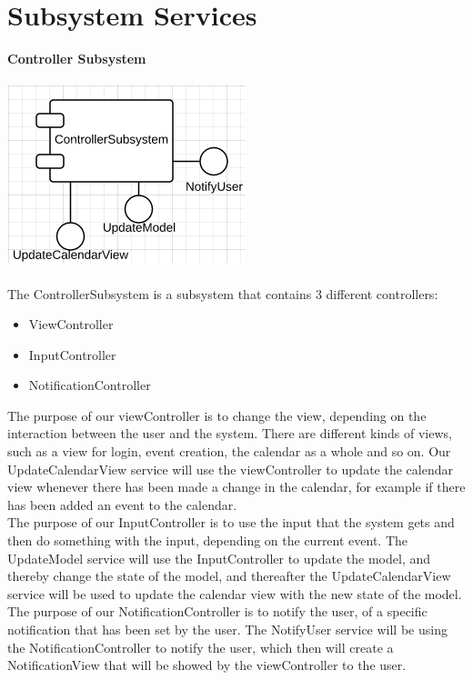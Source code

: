 \chapter{Subsystem Services}


\textbf{Controller Subsystem}\\\\
\includegraphics[scale=0.8]{ControllerServices}\\\\

The ControllerSubsystem is a subsystem that contains 3 different controllers:

\begin{itemize}
  \item ViewController
  \item InputController
  \item NotificationController
\end{itemize}

The purpose of our viewController is to change the view, depending on the interaction between the user and the system. There are different kinds of views, such as a view for login, event creation, the calendar as a whole and so on. Our UpdateCalendarView service will use the viewController to update the calendar view whenever there has been made a change in the calendar, for example if there has been added an event to the calendar.\\

The purpose of our InputController is to use the input that the system gets and then do something with the input, depending on the current event. The UpdateModel service will use the InputController to update the model, and thereby change the state of the model, and thereafter the UpdateCalendarView service will be used to update the calendar view with the new state of the model.\\

The purpose of our NotificationController is to notify the user, of a specific notification that has been set by the user. The NotifyUser service will be using the NotificationController to notify the user, which then will create a NotificationView that will be showed by the viewController to the user.\\


